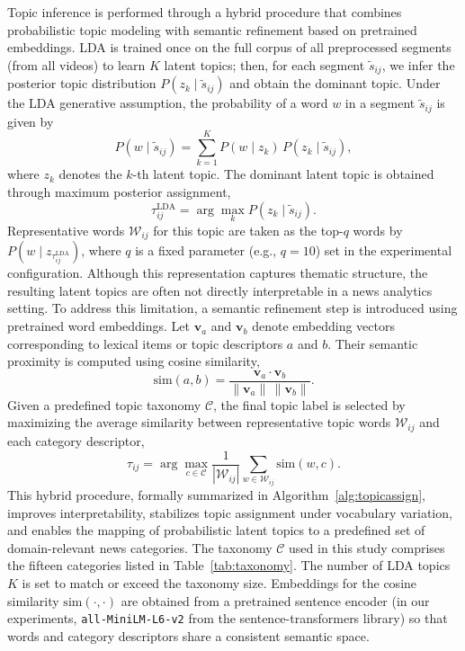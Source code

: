 \documentclass[final,1p,times]{elsarticle}
\begin{document}
Topic inference is performed through a hybrid procedure that combines probabilistic topic modeling with semantic refinement based on pretrained embeddings. LDA is trained once on the full corpus of all preprocessed segments (from all videos) to learn $K$ latent topics; then, for each segment $\tilde{s}_{ij}$, we infer the posterior topic distribution $P(z_k \mid \tilde{s}_{ij})$ and obtain the dominant topic. Under the LDA generative assumption, the probability of a word $w$ in a segment $\tilde{s}_{ij}$ is given by
\begin{equation}
P(w \mid \tilde{s}_{ij}) = \sum_{k=1}^{K} P(w \mid z_k)\,P(z_k \mid \tilde{s}_{ij}),
\end{equation}
where $z_k$ denotes the $k$-th latent topic. The dominant latent topic is obtained through maximum posterior assignment,
\begin{equation}
\tau_{ij}^{\mathrm{LDA}} = \arg\max_k P(z_k \mid \tilde{s}_{ij}).
\end{equation}
Representative words $\mathcal{W}_{ij}$ for this topic are taken as the top-$q$ words by $P(w \mid z_{\tau_{ij}^{\mathrm{LDA}}})$, where $q$ is a fixed parameter (e.g., $q=10$) set in the experimental configuration. Although this representation captures thematic structure, the resulting latent topics are often not directly interpretable in a news analytics setting. To address this limitation, a semantic refinement step is introduced using pretrained word embeddings. Let $\mathbf{v}_a$ and $\mathbf{v}_b$ denote embedding vectors corresponding to lexical items or topic descriptors $a$ and $b$. Their semantic proximity is computed using cosine similarity,
\begin{equation}
\mathrm{sim}(a,b)=\frac{\mathbf{v}_a \cdot \mathbf{v}_b}{\|\mathbf{v}_a\|\,\|\mathbf{v}_b\|}.
\end{equation}
Given a predefined topic taxonomy $\mathcal{C}$, the final topic label is selected by maximizing the average similarity between representative topic words $\mathcal{W}_{ij}$ and each category descriptor,
\begin{equation}
\tau_{ij}=\arg\max_{c \in \mathcal{C}} \frac{1}{|\mathcal{W}_{ij}|}\sum_{w \in \mathcal{W}_{ij}} \mathrm{sim}(w,c).
\end{equation}
This hybrid procedure, formally summarized in Algorithm~\ref{alg:topicassign}, improves interpretability, stabilizes topic assignment under vocabulary variation, and enables the mapping of probabilistic latent topics to a predefined set of domain-relevant news categories. The taxonomy $\mathcal{C}$ used in this study comprises the fifteen categories listed in Table~\ref{tab:taxonomy}. The number of LDA topics $K$ is set to match or exceed the taxonomy size. Embeddings for the cosine similarity $\mathrm{sim}(\cdot,\cdot)$ are obtained from a pretrained sentence encoder (in our experiments, \texttt{all-MiniLM-L6-v2} from the sentence-transformers library) so that words and category descriptors share a consistent semantic space.
\end{document}

